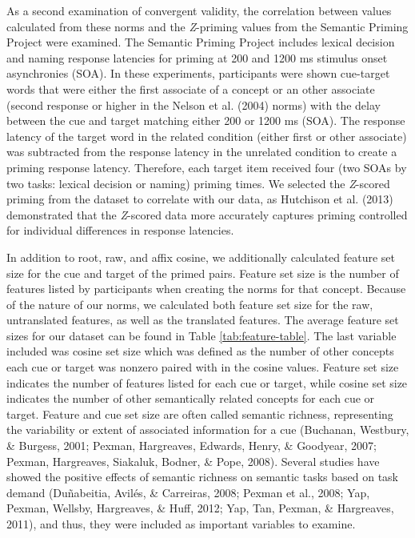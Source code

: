 \documentclass[english,,man]{apa6}
\begin{document}
As a second examination of convergent validity, the correlation between values calculated from these norms and the \emph{Z}-priming values from the Semantic Priming Project were examined. The Semantic Priming Project includes lexical decision and naming response latencies for priming at 200 and 1200 ms stimulus onset asynchronies (SOA). In these experiments, participants were shown cue-target words that were either the first associate of a concept or an other associate (second response or higher in the Nelson et al. (2004) norms) with the delay between the cue and target matching either 200 or 1200 ms (SOA). The response latency of the target word in the related condition (either first or other associate) was subtracted from the response latency in the unrelated condition to create a priming response latency. Therefore, each target item received four (two SOAs by two tasks: lexical decision or naming) priming times. We selected the \emph{Z}-scored priming from the dataset to correlate with our data, as Hutchison et al. (2013) demonstrated that the \emph{Z}-scored data more accurately captures priming controlled for individual differences in response latencies.

In addition to root, raw, and affix cosine, we additionally calculated feature set size for the cue and target of the primed pairs. Feature set size is the number of features listed by participants when creating the norms for that concept. Because of the nature of our norms, we calculated both feature set size for the raw, untranslated features, as well as the translated features. The average feature set sizes for our dataset can be found in Table \ref{tab:feature-table}. The last variable included was cosine set size which was defined as the number of other concepts each cue or target was nonzero paired with in the cosine values. Feature set size indicates the number of features listed for each cue or target, while cosine set size indicates the number of other semantically related concepts for each cue or target. Feature and cue set size are often called semantic richness, representing the variability or extent of associated information for a cue (Buchanan, Westbury, \& Burgess, 2001; Pexman, Hargreaves, Edwards, Henry, \& Goodyear, 2007; Pexman, Hargreaves, Siakaluk, Bodner, \& Pope, 2008). Several studies have showed the positive effects of semantic richness on semantic tasks based on task demand (Duñabeitia, Avilés, \& Carreiras, 2008; Pexman et al., 2008; Yap, Pexman, Wellsby, Hargreaves, \& Huff, 2012; Yap, Tan, Pexman, \& Hargreaves, 2011), and thus, they were included as important variables to examine.
\end{document}
